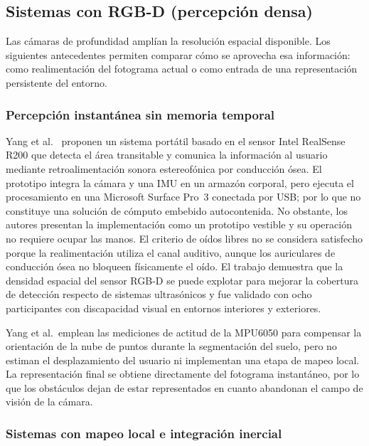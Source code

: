 \subsection{Sistemas con RGB-D (percepción densa)}
\label{sec:ea-rgbd}

Las cámaras de profundidad amplían la resolución espacial disponible. Los siguientes antecedentes
permiten comparar cómo se aprovecha esa información: como realimentación del fotograma actual o
como entrada de una representación persistente del entorno.

\subsubsection{Percepción instantánea sin memoria temporal}
\label{subsec:ea-percepcion-instantanea}

Yang et al.\ \cite{Yang2016} proponen un sistema portátil basado en el sensor Intel RealSense R200
que detecta el área transitable y comunica la información al usuario mediante retroalimentación
sonora estereofónica por conducción ósea. El prototipo integra la cámara y una IMU en un armazón
corporal, pero ejecuta el procesamiento en una Microsoft Surface Pro~3 conectada por USB; por lo
que no constituye una solución de cómputo embebido autocontenida. No obstante, los autores presentan
la implementación como un prototipo vestible y su operación no requiere ocupar las manos. El
criterio de oídos libres no se considera satisfecho porque la realimentación utiliza el canal
auditivo, aunque los auriculares de conducción ósea no bloqueen físicamente el oído. El trabajo
demuestra que la
densidad espacial del sensor RGB-D se puede explotar para mejorar la cobertura de detección respecto
de sistemas ultrasónicos y fue validado con ocho participantes con discapacidad visual en entornos
interiores y exteriores.

Yang et al.\ emplean las mediciones de actitud de la MPU6050 para compensar la orientación de la
nube de puntos durante la segmentación del suelo, pero no estiman el desplazamiento del usuario ni
implementan una etapa de mapeo local. La representación final se obtiene directamente del fotograma
instantáneo, por lo que los obstáculos dejan de estar representados en cuanto abandonan el
campo de visión de la cámara.

\subsubsection{Sistemas con mapeo local e integración inercial}
\label{subsec:ea-mapeo-inercial}

